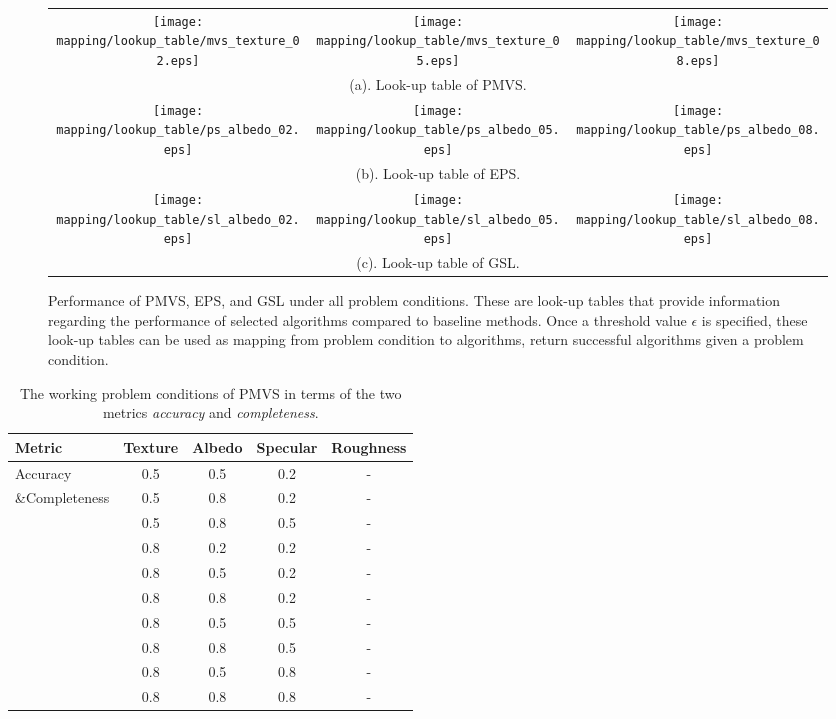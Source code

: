 \begin{figure}
\centering
\begin{tabular}{ccc}
\texttt{[image: mapping/lookup\_table/mvs\_texture\_02.eps]} &
\texttt{[image: mapping/lookup\_table/mvs\_texture\_05.eps]} &
\texttt{[image: mapping/lookup\_table/mvs\_texture\_08.eps]}\\
\multicolumn{3}{c}{(a). Look-up table of PMVS.}\\
\texttt{[image: mapping/lookup\_table/ps\_albedo\_02.eps]} &
\texttt{[image: mapping/lookup\_table/ps\_albedo\_05.eps]} &
\texttt{[image: mapping/lookup\_table/ps\_albedo\_08.eps]}\\
\multicolumn{3}{c}{(b). Look-up table of EPS.}\\
\texttt{[image: mapping/lookup\_table/sl\_albedo\_02.eps]} &
\texttt{[image: mapping/lookup\_table/sl\_albedo\_05.eps]} &
\texttt{[image: mapping/lookup\_table/sl\_albedo\_08.eps]}\\
\multicolumn{3}{c}{(c). Look-up table of GSL.}
\end{tabular}
\caption{Performance of PMVS, EPS, and GSL under all problem conditions. These are look-up tables that provide information regarding the performance of selected algorithms compared to baseline methods. Once a threshold value $\epsilon$ is specified, these look-up tables can be used as mapping from problem condition to algorithms, \ie return successful algorithms given a problem condition.}
\label{fig:lookup_table}
\end{figure}

\begin{table}[!htbp]
\centering
\begin{tabular}{l*{4}{c}}
\toprule
\textbf{Metric} & Texture & Albedo & Specular & Roughness\\
\midrule
Accuracy & 0.5 & 0.5 & 0.2 & -\\
\&Completeness & 0.5 & 0.8 & 0.2 & -\\
         & 0.5 & 0.8 & 0.5 & -\\
         & 0.8 & 0.2 & 0.2 & -\\
         & 0.8 & 0.5 & 0.2 & -\\
         & 0.8 & 0.8 & 0.2 & -\\
         & 0.8 & 0.5 & 0.5 & -\\
         & 0.8 & 0.8 & 0.5 & -\\
         & 0.8 & 0.5 & 0.8 & -\\
         & 0.8 & 0.8 & 0.8 & -\\
\bottomrule
\end{tabular}
\caption{The working problem conditions of PMVS in terms of the two metrics \textit{accuracy} and \textit{completeness}.}
\label{tab:mvs_training_result}
\end{table}

